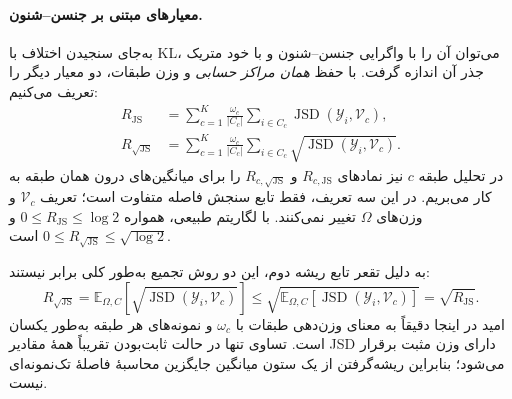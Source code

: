 \paragraph{معیارهای مبتنی بر جنسن--شنون.}

به‌جای سنجیدن اختلاف با KL،
می‌توان آن را با واگرایی جنسن--شنون
و با خود متریک جذر آن اندازه گرفت.
با حفظ \emph{همان مراکز حسابی} و وزن طبقات،
دو معیار دیگر را تعریف می‌کنیم:
\begin{equation}\label{eq:ch3-R-JS-forms}
\boxed{
\begin{aligned}
R_{\mathrm{JS}}
&=\sum_{c=1}^{K}\frac{\omega_c}{|C_c|}
\sum_{i\in C_c}\operatorname{JSD}(\mathscr Y_i,\mathcal V_c),\\
R_{\sqrt{\mathrm{JS}}}
&=\sum_{c=1}^{K}\frac{\omega_c}{|C_c|}
\sum_{i\in C_c}\sqrt{\operatorname{JSD}(\mathscr Y_i,\mathcal V_c)}.
\end{aligned}
}
\end{equation}
در تحلیل طبقه $c$ نیز نمادهای $R_{c,\mathrm{JS}}$
و $R_{c,\sqrt{\mathrm{JS}}}$ را برای میانگین‌های
درون همان طبقه به کار می‌بریم. در این سه تعریف،
فقط تابع سنجش فاصله متفاوت است؛ تعریف
$\mathcal V_c$ و وزن‌های $\Omega$ تغییر نمی‌کنند.
با لگاریتم طبیعی، همواره
$0\le R_{\mathrm{JS}}\le\log2$ و
$0\le R_{\sqrt{\mathrm{JS}}}\le\sqrt{\log2}$ است.

به دلیل تقعر تابع ریشه دوم،
این دو روش تجمیع به‌طور کلی برابر نیستند:
\[
R_{\sqrt{\mathrm{JS}}}
=\mathbb E_{\Omega,C}\!\left[\sqrt{\operatorname{JSD}
(\mathscr Y_i,\mathcal V_c)}\right]
\le\sqrt{\mathbb E_{\Omega,C}\!\left[
\operatorname{JSD}(\mathscr Y_i,\mathcal V_c)\right]}
=\sqrt{R_{\mathrm{JS}}}.
\]
امید در اینجا دقیقاً به معنای وزن‌دهی طبقات با
$\omega_c$ و نمونه‌های هر طبقه به‌طور یکسان است.
تساوی تنها در حالت ثابت‌بودن تقریباً همهٔ
مقادیر JSD دارای وزن مثبت برقرار می‌شود؛
بنابراین ریشه‌گرفتن از یک ستون میانگین
جایگزین محاسبهٔ فاصلهٔ تک‌نمونه‌ای نیست.


